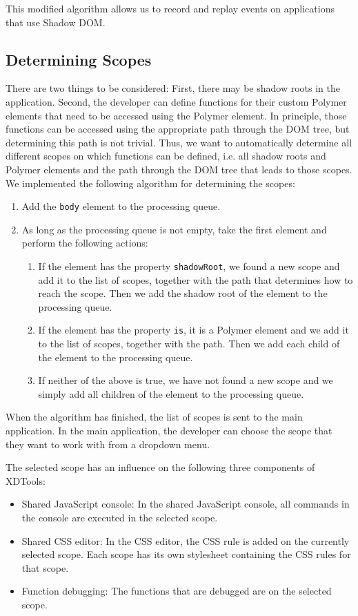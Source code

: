 This modified algorithm allows us to record and replay events on applications that use Shadow DOM. 

\subsection{Determining Scopes}

There are two things to be considered: First, there may be shadow roots in the application. Second, the developer can define functions for their custom Polymer elements that need to be accessed using the Polymer element. In principle, those functions can be accessed using the appropriate path through the DOM tree, but determining this path is not trivial. Thus, we want to automatically determine all different scopes on which functions can be defined, i.e. all shadow roots and Polymer elements and the path through the DOM tree that leads to those scopes. We implemented the following algorithm for determining the scopes:
\begin{enumerate}
	\item Add the \lstinline|body| element to the processing queue.
	\item As long as the processing queue is not empty, take the first element and perform the following actions:
	\begin{enumerate}
		\item If the element has the property \lstinline|shadowRoot|, we found a new scope and add it to the list of scopes, together with the path that determines how to reach the scope. Then we add the shadow root of the element to the processing queue.
		\item If the element has the property \lstinline|is|, it is a Polymer element and we add it to the list of scopes, together with the path. Then we add each child of the element to the processing queue.
		\item If neither of the above is true, we have not found a new scope and we simply add all children of the element to the processing queue.
	\end{enumerate}
\end{enumerate}
When the algorithm has finished, the list of scopes is sent to the main application. In the main application, the developer can choose the scope that they want to work with from a dropdown menu.

The selected scope has an influence on the following three components of XDTools:
\begin{itemize}
	\item Shared JavaScript console: In the shared JavaScript console, all commands in the console are executed in the selected scope. 
	\item Shared CSS editor: In the CSS editor, the CSS rule is added on the currently selected scope. Each scope has its own stylesheet containing the CSS rules for that scope.
	\item Function debugging: The functions that are debugged are on the selected scope.
\end{itemize}